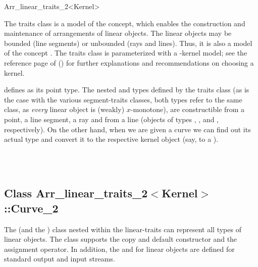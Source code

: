 
\ccRefPageBegin

\begin{ccRefClass}{Arr_linear_traits_2<Kernel>}
    
\ccDefinition 

The traits class \ccRefName{} is a model of the 
concept, which enables the construction and maintenance of arrangements of
linear objects. The linear objects may be bounded (line segments) or
unbounded (rays and lines). Thus, it is also a model of the concept
. The traits class is parameterized
with a \cgal-kernel model; see the reference page of
() for further explanations
and recommendations on choosing a kernel.

\ccRefName{} defines  as its point type. The nested
 and  types defined by the traits class
(as is the case with the various segment-traits classes, both types
refer to the same class, as {\sl every} linear object is (weakly) $x$-monotone),
are constructible from a point, a line segment, a ray and from a line
(objects of types , ,
 and , respectively). On the other
hand, when we are given a curve we can find out its actual type and convert
it to the respective kernel object (say, to a ).

 
\ccIsModel
     \\
     \\
    
\subsection*{Class 
        Arr\_linear\_traits\_2$<$Kernel$>$::Curve\_2}

The  (and the ) class nested within
the linear-traits can represent all types of linear objects. The class
supports the copy and default constructor and the assignment operator.
In addition, the  and  for linear objects
are defined for standard output and input streams.


\end{ccRefClass}
